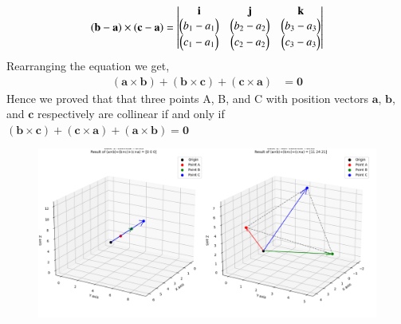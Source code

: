\documentclass[journal]{IEEEtran}
\begin{document}
\[
(\mathbf{b}-\mathbf{a}) \times (\mathbf{c}-\mathbf{a}) =
\begin{vmatrix}
\mathbf{i} & \mathbf{j} & \mathbf{k} \\
\begin{pmatrix}b_1-a_1\end{pmatrix} & \begin{pmatrix}b_2-a_2\end{pmatrix} & \begin{pmatrix}b_3-a_3\end{pmatrix} \\
\begin{pmatrix}c_1-a_1\end{pmatrix} & \begin{pmatrix}c_2-a_2\end{pmatrix} & \begin{pmatrix}c_3-a_3\end{pmatrix}
\end{vmatrix}
\]
Rearranging the equation we get,
\begin{align}
    (\mathbf{a} \times \mathbf{b}) + (\mathbf{b} \times \mathbf{c}) + (\mathbf{c} \times \mathbf{a}) &= \mathbf{0}
\end{align}
Hence we proved that that three points A, B, and C with position vectors $\mathbf{a}$, $\mathbf{b}$, and $\mathbf{c}$ respectively are collinear if and only if $(\mathbf{b} \times \mathbf{c}) + (\mathbf{c} \times \mathbf{a}) + (\mathbf{a} \times \mathbf{b}) = \mathbf{0}$
\begin{figure}[h!]
\begin{center}
\includegraphics[width=0.9\columnwidth]{figs/fig1.png}
\end{center}
\caption{}
\label{fig:Fig.1}
\end{figure}
\end{document}
